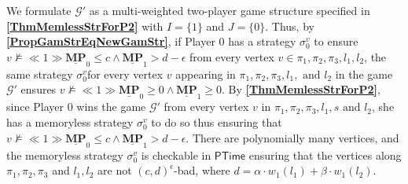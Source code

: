 \noindent We formulate $\mathcal{G'}$ as a multi-weighted two-player game structure specified in \textbf{\cref{ThmMemlessStrForP2}} with $I = \{1\}$ and $J = \{0\}$. 
Thus, by \textbf{\cref{PropGamStrEqNewGamStr}}, if Player 0 has a strategy $\sigma_0^{v}$ to ensure $v \nvDash \ll 1 \gg \underline{\mathbf{MP}}_0 \leqslant c \land \underline{\mathbf{MP}}_1 > d-\epsilon$ from every vertex $v \in \pi_1, \pi_2, \pi_3, l_1, l_2$, the same strategy $\sigma_0^{v}$for every vertex $v$ appearing in $\pi_1, \pi_2, \pi_3, l_1, \text{ and } l_2$ in the game $\mathcal{G'}$ ensures $v \nvDash \ll 1 \gg \underline{\mathbf{MP}}_0 \geqslant 0 \land \underline{\mathbf{MP}}_1 \geqslant 0$. 
By \textbf{\cref{ThmMemlessStrForP2}}, since Player 0 wins the game $\mathcal{G}'$ from every vertex $v$ in $\pi_1, \pi_2, \pi_3, l_1, s \text{ and } l_2$, she has a memoryless strategy $\sigma_0^{v}$ to do so thus ensuring that $v \nvDash \ll 1 \gg \underline{\mathbf{MP}}_0 \leqslant c \land \underline{\mathbf{MP}}_1 > d - \epsilon$. 
There are polynomially many vertices, and the memoryless strategy $\sigma_0^{v}$ is checkable in $\mathsf{PTime}$ ensuring that the vertices along $\pi_1, \pi_2, \pi_3$ and $l_1, l_2$ are not $(c,d)^\epsilon$-bad, where $d = \alpha \cdot w_1(l_1) + \beta \cdot w_1(l_2)$.